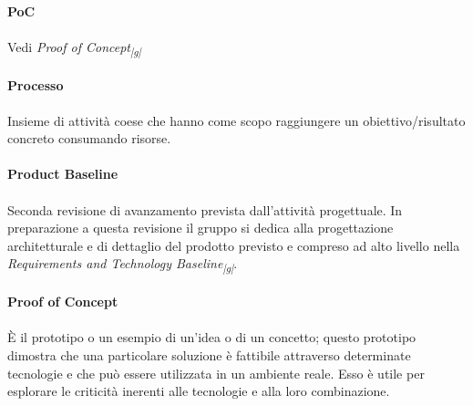 \documentclass[10pt, a4paper]{article}
\newcommand{\pg}{\textsubscript{|g|}}
\begin{document}
\vspace{2em}
\paragraph{PoC}\noindent\hrulefill
\paragraph{} Vedi \textit{Proof of Concept\pg}

\vspace{2em}
\paragraph{Processo}\noindent\hrulefill
\paragraph{}Insieme di attività coese che hanno come scopo raggiungere un obiettivo/risultato concreto consumando risorse.

\vspace{2em}
\paragraph{Product Baseline}\noindent\hrulefill
\paragraph{}Seconda revisione di avanzamento prevista dall’attività progettuale. In preparazione a questa revisione il gruppo si dedica alla progettazione architetturale e di dettaglio del prodotto previsto e compreso ad alto livello nella \textit{Requirements and Technology Baseline\pg}.

\vspace{2em}
\paragraph{Proof of Concept}\noindent\hrulefill
\paragraph{}È il prototipo o un esempio di un’idea o di un concetto; questo prototipo dimostra che una particolare soluzione è fattibile attraverso determinate tecnologie e che può essere utilizzata in un ambiente reale. Esso è utile per esplorare le criticità inerenti alle tecnologie e alla loro combinazione.

\vspace{2em}
\end{document}
